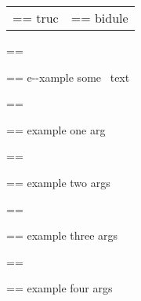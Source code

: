 \documentclass{book}
\makeatletter
\newenvironment{GNUTexinfopreformatted}{%
  \par\GNUTobeylines\obeyspaces\frenchspacing
  \parskip=\z@\parindent=\z@}{}
{\catcode`\^^M=13 \gdef\GNUTobeylines{\catcode`\^^M=13 \def^^M{\null\par}}}
\newenvironment{GNUTexinfoindented}
  {\begin{list}{}{}
  \item\relax}
  {\end{list}}
\makeatother
\begin{document}
\begin{GNUTexinfoindented}
\begin{tabular}{m{} m{}}
\begin{GNUTexinfopreformatted}
\ttfamily truc \end{GNUTexinfopreformatted}&
\begin{GNUTexinfopreformatted}%
\ttfamily bidule
\end{GNUTexinfopreformatted}\\
\end{tabular}%
\begin{GNUTexinfopreformatted}%
\ttfamily 
\end{GNUTexinfopreformatted}
\begin{GNUTexinfoindented}
\begin{GNUTexinfopreformatted}%
\ttfamily e{-}{-}xample  some
\   text
\end{GNUTexinfopreformatted}
\end{GNUTexinfoindented}
\begin{GNUTexinfopreformatted}%
\ttfamily 
\end{GNUTexinfopreformatted}
\begin{GNUTexinfoindented}
\begin{GNUTexinfopreformatted}%
\ttfamily example one arg
\end{GNUTexinfopreformatted}
\end{GNUTexinfoindented}
\begin{GNUTexinfopreformatted}%
\ttfamily 
\end{GNUTexinfopreformatted}
\begin{GNUTexinfoindented}
\begin{GNUTexinfopreformatted}%
\ttfamily example two args
\end{GNUTexinfopreformatted}
\end{GNUTexinfoindented}
\begin{GNUTexinfopreformatted}%
\ttfamily 
\end{GNUTexinfopreformatted}
\begin{GNUTexinfoindented}
\begin{GNUTexinfopreformatted}%
\ttfamily example three args
\end{GNUTexinfopreformatted}
\end{GNUTexinfoindented}
\begin{GNUTexinfopreformatted}%
\ttfamily 
\end{GNUTexinfopreformatted}
\begin{GNUTexinfoindented}
\begin{GNUTexinfopreformatted}%
\ttfamily example four args
\end{GNUTexinfopreformatted}
\end{GNUTexinfoindented}

\end{GNUTexinfoindented}
\end{document}
